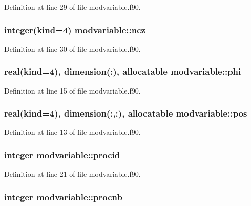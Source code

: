 Definition at line 29 of file modvariable.\-f90.

\hypertarget{classmodvariable_ad8d90278c9709b9db15059e8c320feb4}{
\subsubsection[{ncz}]{\setlength{\rightskip}{0pt plus 5cm}integer(kind=4) modvariable\-::ncz}}\label{classmodvariable_ad8d90278c9709b9db15059e8c320feb4}


Definition at line 30 of file modvariable.\-f90.

\hypertarget{classmodvariable_a00db7c06432451702db34fda71ed1cd1}{
\subsubsection[{phi}]{\setlength{\rightskip}{0pt plus 5cm}real(kind=4), dimension(\-:), allocatable modvariable\-::phi}}\label{classmodvariable_a00db7c06432451702db34fda71ed1cd1}


Definition at line 15 of file modvariable.\-f90.

\hypertarget{classmodvariable_a280e598b1db785bf34f0165ecd7b6985}{
\subsubsection[{pos}]{\setlength{\rightskip}{0pt plus 5cm}real(kind=4), dimension(\-:,\-:), allocatable modvariable\-::pos}}\label{classmodvariable_a280e598b1db785bf34f0165ecd7b6985}


Definition at line 13 of file modvariable.\-f90.

\hypertarget{classmodvariable_af640fc287249ccc7e43133f74d704cf5}{
\subsubsection[{procid}]{\setlength{\rightskip}{0pt plus 5cm}integer modvariable\-::procid}}\label{classmodvariable_af640fc287249ccc7e43133f74d704cf5}


Definition at line 21 of file modvariable.\-f90.

\hypertarget{classmodvariable_a77ab6ce14a18f48d9c5f3ccd1f1cf044}{
\subsubsection[{procnb}]{\setlength{\rightskip}{0pt plus 5cm}integer modvariable\-::procnb}}\label{classmodvariable_a77ab6ce14a18f48d9c5f3ccd1f1cf044}


